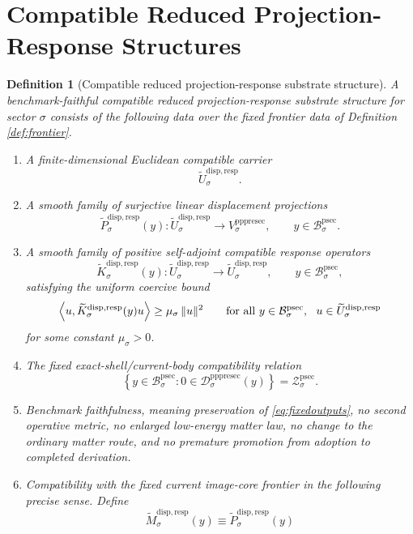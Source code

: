 \documentclass[11pt]{article}
\newcommand{\ProtoSectionBody}[1]{\mathcal B_{#1}^{\mathrm{psec}}}
\newcommand{\ProtoSectionShell}[1]{\mathcal Z_{#1}^{\mathrm{psec}}}
\newcommand{\PrePreProtoSectionVertical}[1]{V_{#1}^{\mathrm{pppresec}}}
\newcommand{\PrePreProtoSectionResidualBody}[1]{\mathcal D_{#1}^{\mathrm{pppresec}}}
\newcommand{\CompatibleCarrier}[1]{\widetilde U_{#1}^{\mathrm{disp,resp}}}
\newcommand{\CompatibleProjection}[1]{\widetilde P_{#1}^{\mathrm{disp,resp}}}
\newcommand{\CompatibleOperator}[1]{\widetilde K_{#1}^{\mathrm{disp,resp}}}
\newcommand{\CompatibleSchur}[1]{\widetilde M_{#1}^{\mathrm{disp,resp}}}
\newtheorem{definition}{Definition}
\begin{document}
\section{Compatible Reduced Projection-Response Structures}

\begin{definition}[Compatible reduced projection-response substrate structure]
\label{def:compatible}
A \emph{benchmark-faithful compatible reduced projection-response substrate structure} for sector \(\sigma\) consists of the following data over the fixed frontier data of Definition \ref{def:frontier}.
\begin{enumerate}
    \item A finite-dimensional Euclidean compatible carrier
    \[
    \CompatibleCarrier{\sigma}.
    \]
    \item A smooth family of surjective linear displacement projections
    \[
    \CompatibleProjection{\sigma}(y):
    \CompatibleCarrier{\sigma}\to\PrePreProtoSectionVertical{\sigma},
    \qquad
    y\in\ProtoSectionBody{\sigma}.
    \]
    \item A smooth family of positive self-adjoint compatible response operators
    \[
    \CompatibleOperator{\sigma}(y):
    \CompatibleCarrier{\sigma}\to\CompatibleCarrier{\sigma},
    \qquad
    y\in\ProtoSectionBody{\sigma},
    \]
    satisfying the uniform coercive bound
    \begin{equation}
    \ev{u,\CompatibleOperator{\sigma}(y)u}
    \ge
    \mu_{\sigma}\,\|u\|^2
    \qquad
    \text{for all }
    y\in\ProtoSectionBody{\sigma},
    \ \ u\in\CompatibleCarrier{\sigma}
    \label{eq:coercive}
    \end{equation}
    for some constant \(\mu_{\sigma}>0\).
    \item The fixed exact-shell/current-body compatibility relation
    \[
    \left\{
    y\in\ProtoSectionBody{\sigma}:0\in\PrePreProtoSectionResidualBody{\sigma}(y)
    \right\}
    =
    \ProtoSectionShell{\sigma}.
    \]
    \item Benchmark faithfulness, meaning preservation of \eqref{eq:fixedoutputs}, no second operative metric, no enlarged low-energy matter law, no change to the ordinary matter route, and no premature promotion from adoption to completed derivation.
    \item Compatibility with the fixed current image-core frontier in the following precise sense. Define
    \begin{equation}
    \CompatibleSchur{\sigma}(y)
    \equiv
    \CompatibleProjection{\sigma}(y)

\end{equation}
\end{enumerate}
\end{definition}
\end{document}

